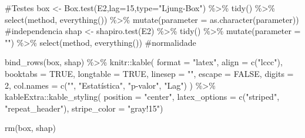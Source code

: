 \documentclass[
  letterpaper,
  DIV=11,
  numbers=noendperiod]{scrartcl}
\newenvironment{Shaded}{\begin{snugshade}}{\end{snugshade}}
\newcommand{\AttributeTok}[1]{\textcolor[rgb]{0.40,0.45,0.13}{#1}}
\newcommand{\CommentTok}[1]{\textcolor[rgb]{0.37,0.37,0.37}{#1}}
\newcommand{\ConstantTok}[1]{\textcolor[rgb]{0.56,0.35,0.01}{#1}}
\newcommand{\DecValTok}[1]{\textcolor[rgb]{0.68,0.00,0.00}{#1}}
\newcommand{\FunctionTok}[1]{\textcolor[rgb]{0.28,0.35,0.67}{#1}}
\newcommand{\NormalTok}[1]{\textcolor[rgb]{0.00,0.23,0.31}{#1}}
\newcommand{\OtherTok}[1]{\textcolor[rgb]{0.00,0.23,0.31}{#1}}
\newcommand{\SpecialCharTok}[1]{\textcolor[rgb]{0.37,0.37,0.37}{#1}}
\newcommand{\StringTok}[1]{\textcolor[rgb]{0.13,0.47,0.30}{#1}}
\begin{document}
\begin{Shaded}
\begin{Highlighting}[]
\CommentTok{\#Testes}
\NormalTok{box }\OtherTok{\textless{}{-}} \FunctionTok{Box.test}\NormalTok{(E2,}\AttributeTok{lag=}\DecValTok{15}\NormalTok{,}\AttributeTok{type=}\StringTok{"Ljung{-}Box"}\NormalTok{) }\SpecialCharTok{\%\textgreater{}\%} \FunctionTok{tidy}\NormalTok{() }\SpecialCharTok{\%\textgreater{}\%} \FunctionTok{select}\NormalTok{(method, }\FunctionTok{everything}\NormalTok{()) }\SpecialCharTok{\%\textgreater{}\%} \FunctionTok{mutate}\NormalTok{(}\AttributeTok{parameter =} \FunctionTok{as.character}\NormalTok{(parameter)) }\CommentTok{\#independencia}
\NormalTok{shap }\OtherTok{\textless{}{-}} \FunctionTok{shapiro.test}\NormalTok{(E2) }\SpecialCharTok{\%\textgreater{}\%} \FunctionTok{tidy}\NormalTok{() }\SpecialCharTok{\%\textgreater{}\%} \FunctionTok{mutate}\NormalTok{(}\AttributeTok{parameter =} \StringTok{""}\NormalTok{) }\SpecialCharTok{\%\textgreater{}\%} \FunctionTok{select}\NormalTok{(method, }\FunctionTok{everything}\NormalTok{())  }\CommentTok{\#normalidade}

\FunctionTok{bind\_rows}\NormalTok{(box, shap) }\SpecialCharTok{\%\textgreater{}\%}
\NormalTok{  knitr}\SpecialCharTok{::}\FunctionTok{kable}\NormalTok{(}
    \AttributeTok{format =} \StringTok{"latex"}\NormalTok{,}
    \AttributeTok{align =} \FunctionTok{c}\NormalTok{(}\StringTok{"lccc"}\NormalTok{),}
    \AttributeTok{booktabs =} \ConstantTok{TRUE}\NormalTok{,}
    \AttributeTok{longtable =} \ConstantTok{TRUE}\NormalTok{,}
    \AttributeTok{linesep =} \StringTok{""}\NormalTok{,}
    \AttributeTok{escape =} \ConstantTok{FALSE}\NormalTok{,}
    \AttributeTok{digits =} \DecValTok{2}\NormalTok{,}
    \AttributeTok{col.names =} \FunctionTok{c}\NormalTok{(}\StringTok{""}\NormalTok{, }\StringTok{"Estatística"}\NormalTok{, }\StringTok{"p{-}valor"}\NormalTok{, }\StringTok{"Lag"}\NormalTok{)}
\NormalTok{    ) }\SpecialCharTok{\%\textgreater{}\%}
\NormalTok{  kableExtra}\SpecialCharTok{::}\FunctionTok{kable\_styling}\NormalTok{(}
      \AttributeTok{position =} \StringTok{"center"}\NormalTok{,}
      \AttributeTok{latex\_options =} \FunctionTok{c}\NormalTok{(}\StringTok{"striped"}\NormalTok{, }\StringTok{"repeat\_header"}\NormalTok{),}
      \AttributeTok{stripe\_color =} \StringTok{"gray!15"}\NormalTok{)}

\FunctionTok{rm}\NormalTok{(box, shap)}



\end{Highlighting}
\end{Shaded}
\end{document}
